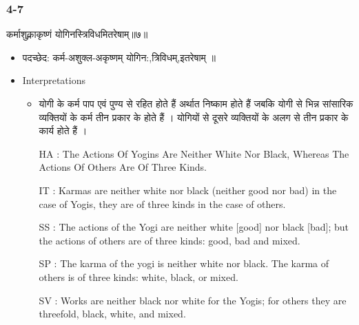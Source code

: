 \begin{frame}[fragile]\frametitle{4-7}
\begin{sanskrit}
कर्माशुक्लाकृष्णं योगिनस्त्रिविधमितरेषाम्॥७॥
\end{sanskrit}

	\begin{itemize}
	\item पदच्छेद:  कर्म-अशुक्ल-अकृष्णम् योगिन:,त्रिविधम्,इतरेषाम् ॥
	\item Interpretations
		\begin{itemize}	
		\item योगी के कर्म पाप एवं पुण्य से रहित होते हैं अर्थात निष्काम होते हैं जबकि योगी से भिन्न सांसारिक व्यक्तियों के कर्म तीन प्रकार के होते हैं । योगियों से दूसरे व्यक्तियों के अलग से तीन प्रकार के कार्य होते हैं ।
		\item [HA]: The Actions Of Yogins Are Neither White Nor Black, Whereas The Actions Of Others Are Of Three Kinds.
		\item [IT]: Karmas are neither white nor black (neither good nor bad) in the case of Yogis, they are of three kinds in the case of others.
		\item [SS]: The actions of the Yogi are neither white [good] nor black [bad]; but the actions of others are of three kinds: good, bad and mixed.
		\item [SP]: The karma of the yogi is neither white nor black. The karma of others is of three kinds: white, black, or mixed.
		\item [SV]: Works are neither black nor white for the Yogis; for others they are threefold, black, white, and mixed.
		\end{itemize}
	\end{itemize}
\end{frame}



